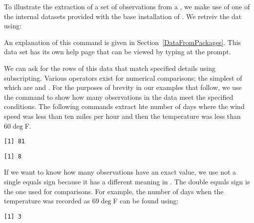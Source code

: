  
To illustrate the extraction of a set of observations from a , we make use of one of the internal datasets provided with the base installation of \R{}. We retreiv the  dat using: 
\begin{knitrout}
\color{fgcolor}\begin{kframe}
\begin{alltt}
\hlstd{> }
\end{alltt}
\end{kframe}
\end{knitrout}
An explanation of this command is given in Section~\ref{DataFromPackages}. This data set has its own help page that can be viewed by typing  at the \R{} prompt. 
 
 
We can ask for the rows of this data that match specified details using subscripting. Various operators exist for numerical comparisons; the simplest of which are \Roperator{<} and  \Roperator{>}. 
For the purposes of brevity in our examples that follow, we use the  command to show how many observations in the data meet the specified conditions. The following commands extract hte number of days where the wind speed was less than ten miles per hour and then the temperature was less than $60\deg$F. 
\begin{knitrout}
\color{fgcolor}\begin{kframe}
\begin{alltt}
\hlstd{> }\hlstd{(airquality[airquality}\hlopt{$}\hlopt{<}\hlstd{,])}
\end{alltt}
\begin{verbatim}
[1] 81
\end{verbatim}
\begin{alltt}
\hlstd{> }\hlstd{(airquality[airquality}\hlopt{$}\hlopt{<}\hlstd{,])}
\end{alltt}
\begin{verbatim}
[1] 8
\end{verbatim}
\end{kframe}
\end{knitrout}
 
If we want to know how many observations have an exact value, we use \Roperator{==} not a single equals sign because it has a different meaning in \R{}. The double equals sign is the one used for comparisons. For example, the number of days when the temperature was recorded as $69\deg$F can be found using: 
\begin{knitrout}
\color{fgcolor}\begin{kframe}
\begin{alltt}
\hlstd{> }\hlstd{(airquality[airquality}\hlopt{$}\hlopt{==}\hlstd{,])}
\end{alltt}
\begin{verbatim}
[1] 3
\end{verbatim}
\end{kframe}
\end{knitrout}
 
